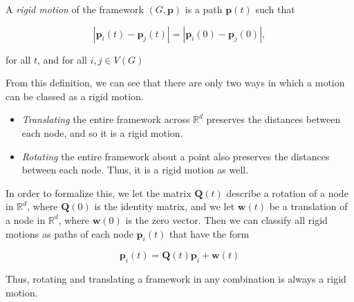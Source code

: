 \begin{definition}
A \textit{rigid motion} of the framework $(G,\mathbf{p})$ is a path $\mathbf{p}(t)$ such that 

\[
|\mathbf{p}_i(t) - \mathbf{p}_j(t)| = |\mathbf{p}_i(0) - \mathbf{p}_j(0)|,
\]

\noindent
for all $t$, and for all $i, j \in V(G)$
\end{definition}

\begin{flushleft}
From this definition, we can see that there are only two ways in which a motion can be classed as a rigid motion.     
\end{flushleft}

\begin{itemize}
    \item \textit{Translating} the entire framework across $\mathbb{R}^d$ preserves the distances between each node, and so it is a rigid motion.
    \vspace{-3mm}
    \item \textit{Rotating} the entire framework about a point also preserves the distances between each node. Thus, it is a rigid motion as well.
    
\end{itemize}

\begin{flushleft}
In order to formalize this, we let the matrix $\mathbf{Q}(t)$ describe a rotation of a node in $\mathbb{R}^d$, where $\mathbf{Q}(0)$ is the identity matrix, and we let $\mathbf{w}(t)$ be a translation of a node in $\mathbb{R}^d$, where $\mathbf{w}(0)$ is the zero vector. Then we can classify all rigid motions as paths of each node $\mathbf{p}_i(t)$ that have the form 

\[
\mathbf{p}_i(t) = \mathbf{Q}(t)\mathbf{p}_i + \mathbf{w}(t)
\]

\vspace{2mm}
Thus, rotating and translating a framework in any combination is always a rigid motion.
\end{flushleft}

